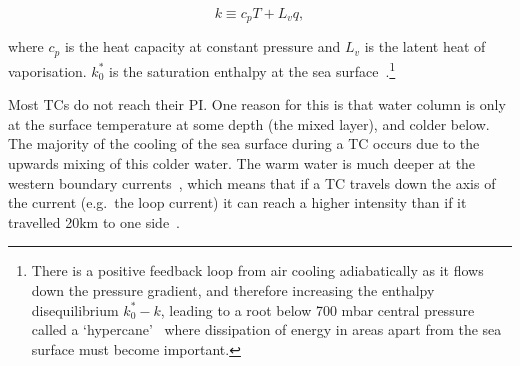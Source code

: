 \begin{equation}
k \equiv c_{p} T+L_{v} q,
\label{eq:enthalpy_per_unit_mass}
\end{equation}



where $c_p$ is the heat capacity at constant pressure and $L_{v}$ is the latent heat
of vaporisation. $k_{0}^{*}$ is the saturation enthalpy at the sea
surface~\cite{emanuel2018progress}.\footnote{
There is a positive feedback loop from air cooling adiabatically as it flows down
the pressure gradient, and therefore increasing the enthalpy disequilibrium
$k_{0}^{*}-k$, leading to a root below 700 mbar central pressure called a `hypercane'~\cite{emanuel1987dependence}
where dissipation of energy in areas apart from the sea surface must become important.

}





Most TCs do not reach their PI.
One reason for this is that
water column is only at the surface temperature
at some depth (the mixed layer), and colder below.
The majority of the cooling of
the sea surface during a TC occurs due to the
upwards mixing of this colder water.
The warm water
is much deeper at the western boundary currents~\cite{hogg1995western},
which means that if a TC
travels down the axis of the current (e.g.~the loop current)
it can reach a higher intensity than
if it travelled 20km to one side~\cite{emanuel2005divine}.
